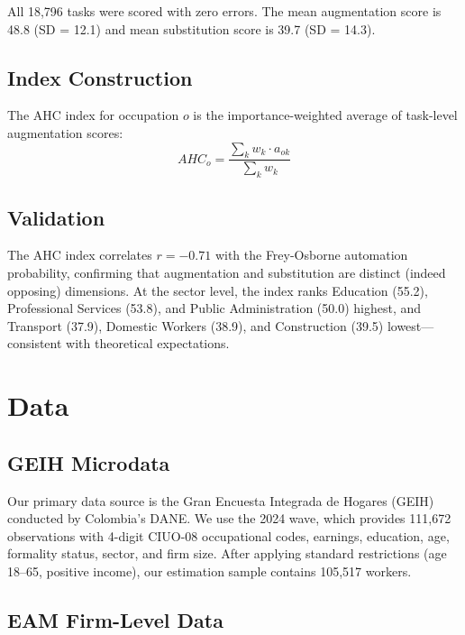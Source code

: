 \documentclass[12pt,a4paper]{article}
\begin{document}
All 18,796 tasks were scored with zero errors. The mean augmentation score is 48.8 (SD = 12.1) and mean substitution score is 39.7 (SD = 14.3).

\subsection{Index Construction}

The AHC index for occupation $o$ is the importance-weighted average of task-level augmentation scores:
\begin{equation}
AHC_o = \frac{\sum_k w_k \cdot a_{ok}}{\sum_k w_k}
\end{equation}

\subsection{Validation}

The AHC index correlates $r = -0.71$ with the Frey-Osborne automation probability, confirming that augmentation and substitution are distinct (indeed opposing) dimensions. At the sector level, the index ranks Education (55.2), Professional Services (53.8), and Public Administration (50.0) highest, and Transport (37.9), Domestic Workers (38.9), and Construction (39.5) lowest---consistent with theoretical expectations.


\section{Data}
\label{sec:data}

\subsection{GEIH Microdata}

Our primary data source is the Gran Encuesta Integrada de Hogares (GEIH) conducted by Colombia's DANE. We use the 2024 wave, which provides 111,672 observations with 4-digit CIUO-08 occupational codes, earnings, education, age, formality status, sector, and firm size. After applying standard restrictions (age 18--65, positive income), our estimation sample contains 105,517 workers.

\subsection{EAM Firm-Level Data}
\end{document}
